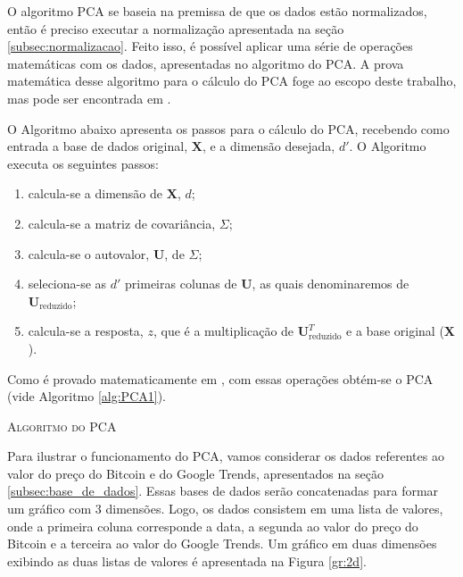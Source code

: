 O algoritmo PCA se baseia na premissa de que os dados estão normalizados, então é preciso executar a normalização apresentada na seção \ref{subsec:normalizacao}. Feito isso, é possível aplicar uma série de operações matemáticas com os dados, apresentadas no algoritmo do PCA. A prova matemática desse algoritmo para o cálculo do PCA foge ao escopo deste trabalho, mas pode ser encontrada em \cite{Jolliffe}.

O Algoritmo abaixo apresenta os passos para o cálculo do PCA, recebendo como entrada a base de dados original, $\mathbf{X}$, e a dimensão desejada, $d'$. O Algoritmo executa os seguintes passos:  
\begin{enumerate}
    \item calcula-se a dimensão de $\mathbf{X}$, $d$;
    \item calcula-se a matriz de covariância, $\Sigma$;
    \item calcula-se o autovalor, $\mathbf{U}$, de $\Sigma$;
    \item seleciona-se as $d'$ primeiras colunas de $\mathbf{U}$, as quais denominaremos de $\mathbf{U}_{\text{reduzido}}$;
    \item calcula-se a resposta, $z$, que é a multiplicação de $\mathbf{U}_{\text{reduzido}}^T$ e a base original ($\mathbf{X}$).
\end{enumerate}

Como é provado matematicamente em \cite{Jolliffe}, com essas operações obtém-se o PCA (vide Algoritmo \ref{alg:PCA1}). 

\begin{center}
 \begin{algorithm}[H]
   \SetAlgoLined
   \label{alg:PCA1}
   \caption{\textsc{Algoritmo do PCA }}
 \end{algorithm}
\end{center}

Para ilustrar o funcionamento do PCA, vamos considerar os dados referentes ao valor do preço do Bitcoin e do Google Trends, apresentados na seção \ref{subsec:base_de_dados}. Essas bases de dados serão concatenadas para formar um gráfico com 3 dimensões. Logo, os dados consistem em uma lista de valores, onde a primeira coluna corresponde a data, a segunda ao valor do preço do Bitcoin e a terceira ao valor do Google Trends. Um gráfico em duas dimensões exibindo as duas listas de valores é apresentada na Figura \ref{gr:2d}. 

